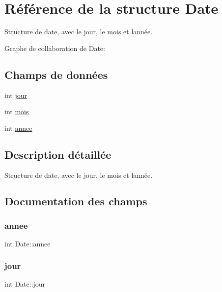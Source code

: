 \hypertarget{structDate}{}\section{Référence de la structure Date}
\label{structDate}


Structure de date, avec le jour, le mois et l\textquotesingle{}année.  




Graphe de collaboration de Date\+:
\subsection*{Champs de données}
\begin{DoxyCompactItemize}
\item 
int \hyperlink{structDate_aa46f17e2418a7a21573b1210f30b4e72}{jour}
\item 
int \hyperlink{structDate_a9ce0f4d74252d7d1bf097ed047fbf880}{mois}
\item 
int \hyperlink{structDate_a350753866b672814ff1c44c55b2d20ca}{annee}
\end{DoxyCompactItemize}


\subsection{Description détaillée}
Structure de date, avec le jour, le mois et l\textquotesingle{}année. 

\subsection{Documentation des champs}
\mbox{\label{structDate_a350753866b672814ff1c44c55b2d20ca}} 
\subsubsection{\texorpdfstring{annee}{annee}}
{\footnotesize\ttfamily int Date\+::annee}

\mbox{\label{structDate_aa46f17e2418a7a21573b1210f30b4e72}} 
\subsubsection{\texorpdfstring{jour}{jour}}
{\footnotesize\ttfamily int Date\+::jour}

